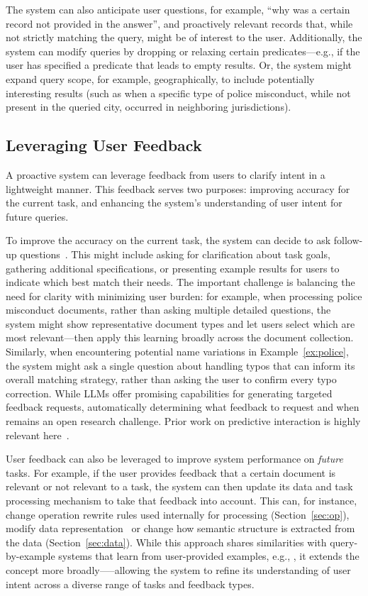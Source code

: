 The system can also anticipate user questions, for example, ``why was a certain record not provided in the answer'', 
and proactively relevant records that, 
while not strictly matching the query, might be of interest to the user. 
Additionally, the system can modify queries by dropping or relaxing certain predicates---e.g., if the user has specified a predicate that leads to empty results. 
Or, the system might expand query scope, for example, geographically, to include potentially interesting results 
(such as when a specific type of police misconduct, while not present in the queried city, occurred in neighboring jurisdictions).


\subsection{Leveraging User Feedback}\label{sec:feedback}
A proactive system can leverage feedback from users to clarify intent in a lightweight manner.
This feedback serves two purposes: improving accuracy for the current task, and enhancing the system's understanding of user intent for future queries.


To improve the accuracy on the current task, the system can decide to ask follow-up questions~\cite{li2024llms}. This might include asking for clarification about task goals, gathering additional specifications, or presenting example results for users to indicate which best match their needs. The important challenge is balancing the need for clarity with minimizing user burden: for example, when processing police misconduct documents, rather than asking multiple detailed questions, the system might show representative document types and let users select which are most relevant---then apply this learning broadly across the document collection. Similarly, when encountering potential name variations in Example~\ref{ex:police}, the system might ask a single question about handling typos that can inform its overall matching strategy, rather than asking the user to confirm every typo correction. While LLMs offer promising capabilities for generating targeted feedback requests, automatically determining what feedback to request and when remains an open research challenge. Prior work
on predictive interaction is highly relevant here~\cite{2015-predictive-interaction}.


User feedback can also be leveraged to improve system performance on {\em future} tasks. For example, if the user provides feedback that a certain document is relevant or not relevant to a task, the system can then update its data and task processing mechanism to take that feedback into account. This can, for instance, change operation rewrite rules used internally for processing (Section~\ref{sec:op}), modify data representation~\cite{zeighami2024nudge} or change how semantic structure is extracted from the data (Section~\ref{sec:data}). While this approach shares similarities with query-by-example systems that learn from user-provided examples, e.g., \cite{fariha2018squid}, it extends the concept more broadly—--allowing the system to refine its understanding of user intent across a diverse range of tasks and feedback types.

